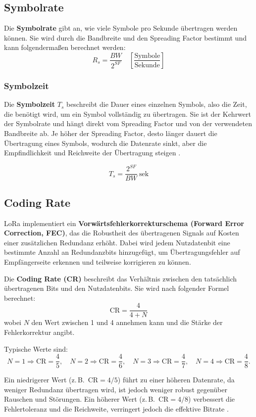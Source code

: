 	\subsection{Symbolrate \label{lora:symbolRate}}
	Die \textbf{Symbolrate} gibt an, wie viele Symbole pro Sekunde übertragen werden können. 
	Sie wird durch die Bandbreite und den Spreading Factor bestimmt und kann folgenderma{\ss}en berechnet werden:
	\[
	R_s = \frac{BW}{2^{SF}} \quad \left[\frac{\text{Symbole}}{\text{Sekunde}}\right]
	\]
	
	\subsubsection{Symbolzeit \label{lora:symbolTransmissionTime}}
	Die \textbf{Symbolzeit} \(T_s\) beschreibt die Dauer eines einzelnen Symbols, also die Zeit, die benötigt wird, um ein Symbol vollständig zu übertragen. Sie ist der Kehrwert der Symbolrate und hängt direkt vom Spreading Factor und von der verwendeten Bandbreite ab. Je höher der Spreading Factor, desto länger dauert die Übertragung eines Symbols, wodurch die Datenrate sinkt, aber die Empfindlichkeit und Reichweite der Übertragung steigen \cite{Montagny:2022}. 
	
	\[
	T_s = \frac{2^{SF}}{BW}~\text{sek}
	\]

	
	\subsection{Coding Rate \label{lora:codingRate}}
	LoRa implementiert ein \textbf{Vorwärtsfehlerkorrekturschema (Forward Error Correction, FEC)}, das die Robustheit des übertragenen Signals auf Kosten einer zusätzlichen Redundanz erhöht. Dabei wird jedem Nutzdatenbit eine bestimmte Anzahl an Redundanzbits hinzugefügt, um Übertragungsfehler auf Empfängerseite erkennen und teilweise korrigieren zu können.
	
	Die \textbf{Coding Rate (CR)} beschreibt das Verhältnis zwischen den tatsächlich übertragenen Bits und den Nutzdatenbits. Sie wird nach folgender Formel berechnet:
	\[
	\text{CR} = \frac{4}{4 + N}
	\]
	wobei \(N\) den Wert zwischen 1 und 4 annehmen kann und die Stärke der Fehlerkorrektur angibt.
	
	Typische Werte sind:
	\[
	N = 1 \Rightarrow \text{CR} = \frac{4}{5}, \quad
	N = 2 \Rightarrow \text{CR} = \frac{4}{6}, \quad
	N = 3 \Rightarrow \text{CR} = \frac{4}{7}, \quad
	N = 4 \Rightarrow \text{CR} = \frac{4}{8}.
	\]
	
	Ein niedrigerer Wert (z.\,B.\ \(\text{CR} = 4/5\)) führt zu einer höheren Datenrate, da weniger Redundanz übertragen wird, ist jedoch weniger robust gegenüber Rauschen und Störungen. Ein höherer Wert (z.\,B.\ \(\text{CR} = 4/8\)) verbessert die Fehlertoleranz und die Reichweite, verringert jedoch die effektive Bitrate \cite{Montagny:2022}.


